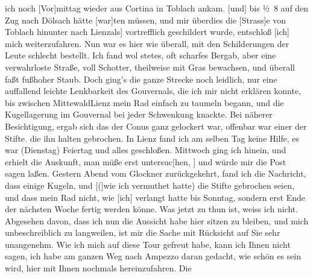 \begin{ledgroupsized}[t]{13cm}
               ich noch {[}Vor{]}mittag wieder aus Cortina in Toblach
                  ankam\textcolor{gray}{,}{ }{[}und{]} bis ½ 8 auf den Zug nach Dölsach hätte {[}war{]}ten müssen, und mir
               überdies die {[}Strass{]}e von Toblach hinunter nach Lienz\oindex{Lienz@\textbf{Lienz}|pw}{[}als{]} vortrefflich geschildert wurde, entschloß
                  {[}ich{]} mich weiterzufahren. Nun war es hier {\pb}wie überall, mit den
               Schilderungen der Leute schlecht bestellt. Ich fand wol stetes, oft scharfes Bergab,
               aber eine verwahrloste Straße, voll Schotter, theilweise mit Gras bewachsen, und
               überall faßt fußhoher Staub. Doch ging’s die ganze Strecke noch leidlich, nur eine
               auffallend leichte Lenkbarkeit des Gouvernals, die ich mir nicht erklären konnte, bis
               zwischen MittewaldLienz mein Rad einfach zu taumeln begann, und die
               Kugellagerung im Gouvernal bei jeder Schwenkung knackte. Bei näherer Besichtigung,
               ergab sich das der Conus ganz gelockert war, offenbar war einer der
                  Stifte\textcolor{gray}{,} die ihn halten gebrochen. In Lienz fand ich am selben
               Tag keine Hilfe, es war (Dienstag) Feiertag und alles geschloßen.
               Mittwoch ging ich hinein, und erhielt die Auskunft, man müße erst
                  untersuc{[}hen, {]} und würde mir die Post sagen laßen. Gestern
               Abend vom Glockner zurückgekehrt, fand ich die
               Nachricht, dass einige Kugeln, und {[}({]}wie ich vermuthet hatte) die
               Stifte gebrochen seien, und dass mein Rad nicht, wie {[}ich{]}{ }{\pb}verlangt hatte bis Sonntag,
               sondern erst Ende der nächsten Woche fertig werden könne. Was jetzt zu thun ist,
               weiss ich nicht. Abgesehen davon, dass ich nun die Aussicht habe hier sitzen zu
               bleiben, und mich unbeschreiblich zu langweilen, ist mir die Sache mit Rücksicht auf
               Sie sehr unangenehm. Wie ich mich auf diese Tour gefreut habe, kann ich Ihnen nicht
               sagen, ich habe am ganzen Weg nach Ampezzo
               daran gedacht, wie schön es sein wird, hier mit Ihnen nochmals hereinzufahren. Die

\end{ledgroupsized}
